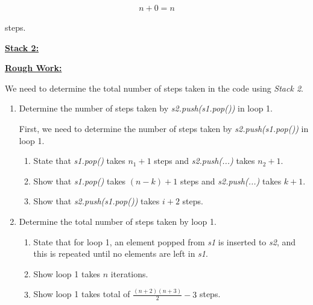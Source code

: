 \documentclass[12pt]{article}
\begin{document}
\begin{enumerate}[a.]
\begin{mdframed}
\begin{mdframed}
        \begin{align}
            n + 0 = n
        \end{align}

        steps.

        \end{mdframed}

    \end{mdframed}

    \bigskip

    \underline{\textbf{Stack 2:}}

    \bigskip

    \begin{mdframed}
        \underline{\textbf{Rough Work:}}

        \bigskip

        We need to determine the total number of steps taken in the code using \textit{Stack 2}.

        \bigskip

        \begin{enumerate}[1.]
            \item Determine the number of steps taken by \textit{s2.push(s1.pop())} in loop 1.

            \bigskip

            First, we need to determine the number of steps taken by \textit{s2.push(s1.pop())} in loop 1.

            \bigskip

            \begin{enumerate}[1.]
                \item State that \textit{s1.pop()} takes $n_1 + 1$ steps and \textit{s2.push(...)}
                takes $n_2 + 1$.
                \item Show that \textit{s1.pop()} takes $(n - k) + 1$ steps and \textit{s2.push(...)}
                takes $k + 1$.
                \item Show that \textit{s2.push(s1.pop())} takes $i + 2$ steps.
            \end{enumerate}

            \item Determine the total number of steps taken by loop 1.

            \bigskip

            \begin{enumerate}[1.]
                \item State that for loop 1, an element popped from \textit{s1}
                is inserted to \textit{s2}, and this is repeated until no elements are left in \textit{s1}.
                \item Show loop 1 takes $n$ iterations.
                \item Show loop 1 takes total of $\displaystyle\frac{(n+2)(n+3)}{2}-3$ steps.
            \end{enumerate}


\end{enumerate}
\end{mdframed}
\end{enumerate}
\end{document}
